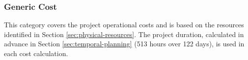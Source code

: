 \subsubsection{Generic Cost}
This category covers the project operational costs and is based on the resources identified in Section \ref{sec:physical-resources}. The project duration, calculated in advance in Section \ref{sec:temporal-planning} (513 hours over 122 days), is used in each cost calculation. 








